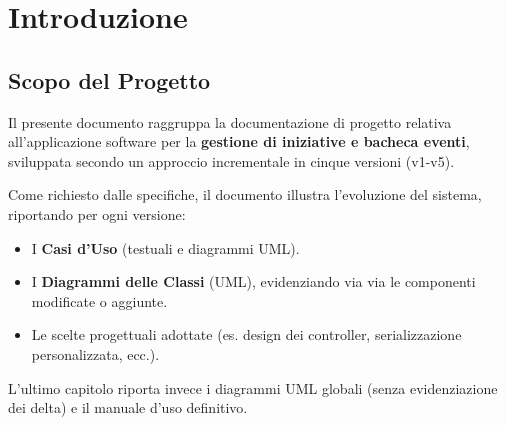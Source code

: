 \chapter{Introduzione}

\section{Scopo del Progetto}
Il presente documento raggruppa la documentazione di progetto relativa all'applicazione software per la \textbf{gestione di iniziative e bacheca eventi}, sviluppata secondo un approccio incrementale in cinque versioni (v1-v5).

Come richiesto dalle specifiche, il documento illustra l'evoluzione del sistema, riportando per ogni versione:
\begin{itemize}
    \item I \textbf{Casi d'Uso} (testuali e diagrammi UML).
    \item I \textbf{Diagrammi delle Classi} (UML), evidenziando via via le componenti modificate o aggiunte.
    \item Le scelte progettuali adottate (es. design dei controller, serializzazione personalizzata, ecc.).
\end{itemize}

L'ultimo capitolo riporta invece i diagrammi UML globali (senza evidenziazione dei delta) e il manuale d'uso definitivo.

